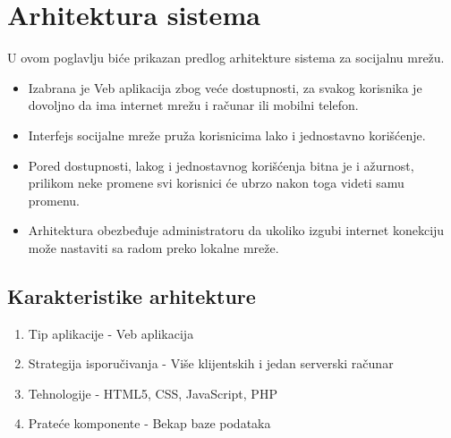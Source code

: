 \section{Arhitektura sistema}
U ovom poglavlju biće prikazan predlog arhitekture sistema za socijalnu mrežu. 
\begin{itemize}
    \item Izabrana je Veb aplikacija zbog veće dostupnosti, za svakog korisnika je dovoljno da ima internet mrežu i računar ili mobilni telefon. 
    \item Interfejs socijalne mreže pruža korisnicima lako i jednostavno korišćenje.
    \item Pored dostupnosti, lakog i jednostavnog korišćenja bitna je i ažurnost, prilikom neke promene svi korisnici će ubrzo nakon toga videti samu promenu. 
    \item Arhitektura obezbeđuje administratoru da ukoliko izgubi internet konekciju može nastaviti sa radom preko lokalne mreže.
\end{itemize}

\subsection{Karakteristike arhitekture}
	\begin{enumerate}
		\item Tip aplikacije - Veb aplikacija
		\item Strategija isporučivanja - Više klijentskih i jedan serverski računar
		\item Tehnologije - HTML5, CSS, JavaScript, PHP
		\item Prateće komponente - Bekap baze podataka 
	\end{enumerate}

